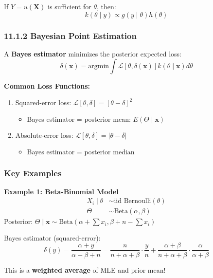 If $Y = u(\mathbf{X})$ is sufficient for $\theta$, then:
\[
k(\theta \mid y) \propto g(y \mid \theta) h(\theta)
\]

\subsubsection{11.1.2 Bayesian Point Estimation}

\begin{definition}
A \textbf{Bayes estimator} minimizes the posterior expected loss:
\[
\delta(\mathbf{x}) = \text{argmin} \int \mathcal{L}[\theta, \delta(\mathbf{x})] k(\theta \mid \mathbf{x}) d\theta
\]
\end{definition}
\textbf{Common Loss Functions:}

\begin{enumerate}
	\item Squared-error loss: $\mathcal{L}[\theta, \delta] = [\theta - \delta]^2$
	\begin{itemize}
		\item Bayes estimator = posterior mean: $E(\Theta \mid \mathbf{x})$
	\end{itemize}
	\item Absolute-error loss: $\mathcal{L}[\theta, \delta] = |\theta - \delta|$
	\begin{itemize}
		\item Bayes estimator = posterior median
	\end{itemize}
\end{enumerate}

\subsubsection{Key Examples}

\textbf{Example 1: Beta-Binomial Model}
\[
\begin{aligned}
X_i \mid \theta &\sim \text{iid Bernoulli}(\theta) \\
\Theta &\sim \text{Beta}(\alpha, \beta)
\end{aligned}
\]
Posterior: $\Theta \mid \mathbf{x} \sim \text{Beta}(\alpha + \sum x_i, \beta + n - \sum x_i)$

Bayes estimator (squared-error):
\[
\delta(y) = \frac{\alpha + y}{\alpha + \beta + n} = \frac{n}{n + \alpha + \beta} \cdot \frac{y}{n} + \frac{\alpha + \beta}{n + \alpha + \beta} \cdot \frac{\alpha}{\alpha + \beta}
\]

This is a \textbf{weighted average} of MLE and prior mean!

